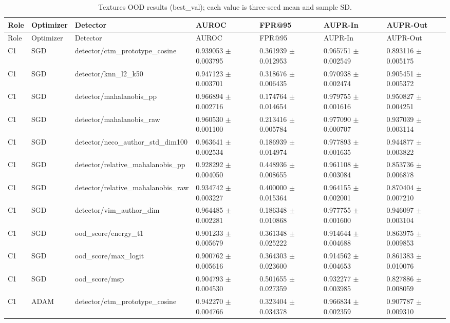 \begin{longtable}{lllllll}
\caption{Textures OOD results (best\_val); each value is three-seed mean and sample SD.}\\
Role & Optimizer & Detector & AUROC & FPR@95 & AUPR-In & AUPR-Out \\
\hline
\endfirsthead
Role & Optimizer & Detector & AUROC & FPR@95 & AUPR-In & AUPR-Out \\
\hline
\endhead
C1 & SGD & detector/ctm\_prototype\_cosine & 0.939053 $\pm$ 0.003795 & 0.361939 $\pm$ 0.012953 & 0.965751 $\pm$ 0.002549 & 0.893116 $\pm$ 0.005175 \\
C1 & SGD & detector/knn\_l2\_k50 & 0.947123 $\pm$ 0.003701 & 0.318676 $\pm$ 0.006435 & 0.970938 $\pm$ 0.002474 & 0.905451 $\pm$ 0.005372 \\
C1 & SGD & detector/mahalanobis\_pp & 0.966894 $\pm$ 0.002716 & 0.174764 $\pm$ 0.014654 & 0.979755 $\pm$ 0.001616 & 0.950827 $\pm$ 0.004251 \\
C1 & SGD & detector/mahalanobis\_raw & 0.960530 $\pm$ 0.001100 & 0.213416 $\pm$ 0.005784 & 0.977090 $\pm$ 0.000707 & 0.937039 $\pm$ 0.003114 \\
C1 & SGD & detector/neco\_author\_std\_dim100 & 0.963641 $\pm$ 0.002534 & 0.186939 $\pm$ 0.014974 & 0.977893 $\pm$ 0.001635 & 0.944877 $\pm$ 0.003822 \\
C1 & SGD & detector/relative\_mahalanobis\_pp & 0.928292 $\pm$ 0.004050 & 0.448936 $\pm$ 0.008655 & 0.961108 $\pm$ 0.003084 & 0.853736 $\pm$ 0.006878 \\
C1 & SGD & detector/relative\_mahalanobis\_raw & 0.934742 $\pm$ 0.003227 & 0.400000 $\pm$ 0.015364 & 0.964155 $\pm$ 0.002001 & 0.870404 $\pm$ 0.007210 \\
C1 & SGD & detector/vim\_author\_dim & 0.964485 $\pm$ 0.002281 & 0.186348 $\pm$ 0.010868 & 0.977755 $\pm$ 0.001600 & 0.946097 $\pm$ 0.003104 \\
C1 & SGD & ood\_score/energy\_t1 & 0.901233 $\pm$ 0.005679 & 0.361348 $\pm$ 0.025222 & 0.914644 $\pm$ 0.004688 & 0.863975 $\pm$ 0.009853 \\
C1 & SGD & ood\_score/max\_logit & 0.900762 $\pm$ 0.005616 & 0.364303 $\pm$ 0.023600 & 0.914562 $\pm$ 0.004653 & 0.861383 $\pm$ 0.010076 \\
C1 & SGD & ood\_score/msp & 0.904793 $\pm$ 0.004530 & 0.501655 $\pm$ 0.027359 & 0.932277 $\pm$ 0.003985 & 0.827886 $\pm$ 0.008059 \\
C1 & ADAM & detector/ctm\_prototype\_cosine & 0.942270 $\pm$ 0.004766 & 0.323404 $\pm$ 0.034378 & 0.966834 $\pm$ 0.002359 & 0.907787 $\pm$ 0.009310 \\

\end{longtable}

